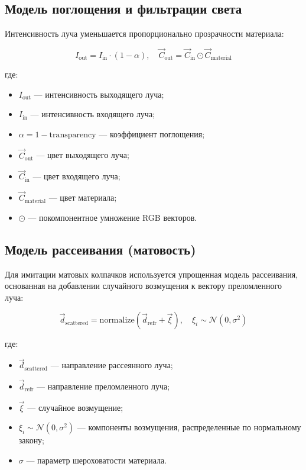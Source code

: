 \subsection{Модель поглощения и фильтрации света}

Интенсивность луча уменьшается пропорционально прозрачности материала:

\begin{equation}
I_{\text{out}} = I_{\text{in}} \cdot (1 - \alpha), \quad \vec{C}_{\text{out}} = \vec{C}_{\text{in}} \odot \vec{C}_{\text{material}}
\end{equation}

где:
\begin{itemize}
    \item $I_{\text{out}}$ --- интенсивность выходящего луча;
    \item $I_{\text{in}}$ --- интенсивность входящего луча;
    \item $\alpha = 1 - \text{transparency}$ --- коэффициент поглощения;
    \item $\vec{C}_{\text{out}}$ --- цвет выходящего луча;
    \item $\vec{C}_{\text{in}}$ --- цвет входящего луча;
    \item $\vec{C}_{\text{material}}$ --- цвет материала;
    \item $\odot$ --- покомпонентное умножение RGB векторов.
\end{itemize}

\subsection{Модель рассеивания (матовость)}

Для имитации матовых колпачков используется упрощенная модель рассеивания, основанная на добавлении случайного возмущения к вектору преломленного луча:

\begin{equation}
\vec{d}_{\text{scattered}} = \text{normalize}(\vec{d}_{\text{refr}} + \vec{\xi}), \quad \xi_i \sim \mathcal{N}(0, \sigma^2)
\end{equation}

где:
\begin{itemize}
    \item $\vec{d}_{\text{scattered}}$ --- направление рассеянного луча;
    \item $\vec{d}_{\text{refr}}$ --- направление преломленного луча;
    \item $\vec{\xi}$ --- случайное возмущение;
    \item $\xi_i \sim \mathcal{N}(0, \sigma^2)$ --- компоненты возмущения, распределенные по нормальному закону;
    \item $\sigma$ --- параметр шероховатости материала.
\end{itemize}

